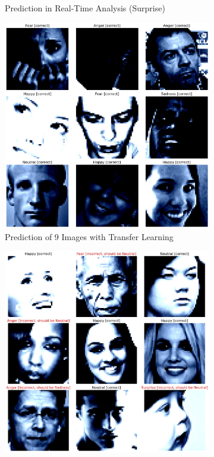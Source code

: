 \documentclass[conference]{IEEEtran}
\begin{document}
\begin{figure}[htbp]
\begin{subfigure}{0.22\textwidth}
        \caption{Prediction in Real-Time Analysis (Surprise)}
        \label{fig:opencvsurprise}
    \end{subfigure}
    \begin{subfigure}{0.22\textwidth}
        \includegraphics[width=\textwidth]{Figures/9imagepredictionTLmodel.png}
        \caption{Prediction of 9 Images with Transfer Learning}
        \label{fig:9imageprediction_TLmodel}
    \end{subfigure}
    \begin{subfigure}{0.22\textwidth}
        \includegraphics[width=\textwidth]{Figures/9imagepredictionNOTLmodel.png}

\end{subfigure}
\end{figure}
\end{document}
